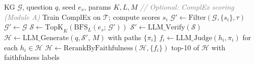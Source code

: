 \begin{algorithm}[tb]
\caption{KG-SCoRE inference}
\label{alg:kgscore}
\begin{algorithmic}[1]
\Require KG $\mathcal{G}$, question $q$, seed $e_s$, params $K,L,M$
\Statex \textcolor{gray}{\textit{// Optional: ComplEx scoring (Module A)}}
  \State Train ComplEx on $\mathcal{T}$; compute scores $s_i$
  \State $\mathcal{G}' \gets \mathrm{Filter}(\mathcal{G}, \{s_i\}, \tau)$
\Else
  \State $\mathcal{G}' \gets \mathcal{G}$
\EndIf
\State $\mathcal{S} \gets \mathrm{TopK}_K(\mathrm{BFS}_L(e_s;\, \mathcal{G}'))$ 
\State $\mathcal{S}' \gets \mathrm{LLM\_Verify}(\mathcal{S})$ 
\State $\mathcal{H} \gets \mathrm{LLM\_Generate}(q, \mathcal{S}',\, M)$ with paths $\{\pi_i\}$ 
\State $f_i \gets \mathrm{LLM\_Judge}(h_i, \pi_i)$ for each $h_i \in \mathcal{H}$ 
\State $\mathcal{H} \gets \mathrm{RerankByFaithfulness}(\mathcal{H}, \{f_i\})$ 
\State \Return top-10 of $\mathcal{H}$ with faithfulness labels
\end{algorithmic}
\end{algorithm}
